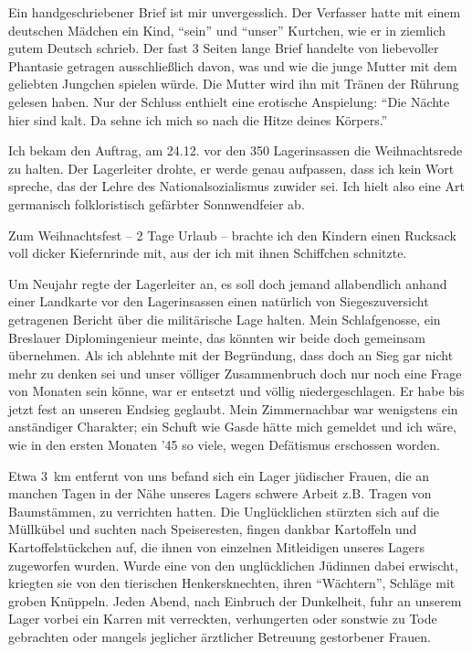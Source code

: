 \documentclass[a5paper,pagesize,10pt,twoside=true]{scrbook}
\renewcommand{\marginpar}[2][]{}
\begin{document}
\marginpar{50} Ein handgeschriebener Brief ist mir unvergesslich. Der Verfasser hatte mit einem deutschen Mädchen ein Kind, \enquote{sein} und \enquote{unser} Kurtchen, wie er in ziemlich gutem Deutsch schrieb. Der fast 3 Seiten lange Brief handelte von liebevoller Phantasie getragen ausschließlich davon, was und wie die junge Mutter mit dem geliebten Jungchen spielen würde. Die Mutter wird ihn mit Tränen der Rührung gelesen haben. Nur der Schluss enthielt eine erotische Anspielung: \enquote{Die Nächte hier sind kalt. Da sehne ich mich so nach die Hitze deines Körpers.}

Ich bekam den Auftrag, am 24.12. vor den 350 Lagerinsassen die Weihnachtsrede zu halten. Der Lagerleiter drohte, er werde genau aufpassen, dass ich kein Wort spreche, das der Lehre des Nationalsozialismus zuwider sei. Ich hielt also eine Art germanisch folkloristisch gefärbter Sonnwendfeier ab.

Zum Weihnachtsfest -- 2 Tage Urlaub -- brachte ich den Kindern einen Rucksack voll dicker Kiefernrinde mit, aus der ich mit ihnen Schiffchen schnitzte.

Um Neujahr regte der Lagerleiter an, es soll doch jemand allabendlich anhand einer Landkarte vor den Lagerinsassen einen natürlich von Siegeszuversicht getragenen Bericht über die militärische Lage halten. Mein Schlafgenosse, ein Breslauer Diplomingenieur meinte, das könnten wir beide doch gemeinsam übernehmen. Als ich ablehnte mit der Begründung, dass doch an Sieg gar nicht mehr zu denken sei und unser völliger Zusammenbruch doch nur noch eine Frage von Monaten sein könne, war er entsetzt und völlig niedergeschlagen. Er habe bis jetzt fest an unseren Endsieg geglaubt. Mein Zimmernachbar war wenigstens ein anständiger Charakter; ein Schuft wie Gasde hätte mich gemeldet und ich wäre, wie in den ersten Monaten '45 so viele, wegen Defätismus erschossen worden.

Etwa 3~km entfernt von uns befand sich ein Lager jüdischer Frauen, die an manchen Tagen in der Nähe unseres Lagers schwere Arbeit z.B. Tragen von Baumstämmen, zu verrichten hatten. Die Unglücklichen stürzten sich auf die Müllkübel und suchten nach Speiseresten, fingen dankbar Kartoffeln und Kartoffelstückchen auf, die ihnen von einzelnen Mitleidigen unseres Lagers zugeworfen wurden. Wurde eine von den \marginpar{52} unglücklichen Jüdinnen dabei erwischt, kriegten sie von den tierischen Henkersknechten, ihren \enquote{Wächtern}, Schläge mit groben Knüppeln. Jeden Abend, nach Einbruch der Dunkelheit, fuhr an unserem Lager vorbei ein Karren mit verreckten, verhungerten oder sonstwie zu Tode gebrachten oder mangels jeglicher ärztlicher Betreuung gestorbener Frauen.
\end{document}
